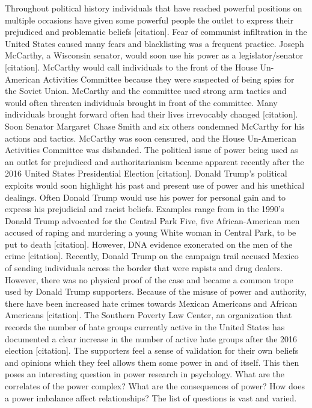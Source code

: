 \documentclass[
  donotrepeattitle,doc, 12pt, a4paper,floatsintext]{apa7}
\begin{document}
Throughout political history individuals that have reached powerful positions on multiple occasions have given some powerful people the outlet to express their prejudiced and problematic beliefs {[}citation{]}. Fear of communist infiltration in the United States caused many fears and blacklisting was a frequent practice. Joseph McCarthy, a Wisconsin senator, would soon use his power as a legislator/senator {[}citation{]}. McCarthy would call individuals to the front of the House Un-American Activities Committee because they were suspected of being spies for the Soviet Union. McCarthy and the committee used strong arm tactics and would often threaten individuals brought in front of the committee. Many individuals brought forward often had their lives irrevocably changed {[}citation{]}. Soon Senator Margaret Chase Smith and six others condemned McCarthy for his actions and tactics. McCarthy was soon censured, and the House Un-American Activities Committee was disbanded. The political issue of power being used as an outlet for prejudiced and authoritarianism became apparent recently after the 2016 United States Presidential Election {[}citation{]}. Donald Trump's political exploits would soon highlight his past and present use of power and his unethical dealings. Often Donald Trump would use his power for personal gain and to express his prejudicial and racist beliefs. Examples range from in the 1990's Donald Trump advocated for the Central Park Five, five African-American men accused of raping and murdering a young White woman in Central Park, to be put to death {[}citation{]}. However, DNA evidence exonerated on the men of the crime {[}citation{]}. Recently, Donald Trump on the campaign trail accused Mexico of sending individuals across the border that were rapists and drug dealers. However, there was no physical proof of the case and became a common trope used by Donald Trump supporters. Because of the misuse of power and authority, there have been increased hate crimes towards Mexican Americans and African Americans {[}citation{]}. The Southern Poverty Law Center, an organization that records the number of hate groups currently active in the United States has documented a clear increase in the number of active hate groups after the 2016 election {[}citation{]}. The supporters feel a sense of validation for their own beliefs and opinions which they feel allows them some power in and of itself. This then poses an interesting question in power research in psychology. What are the correlates of the power complex? What are the consequences of power? How does a power imbalance affect relationships? The list of questions is vast and varied.
\end{document}
